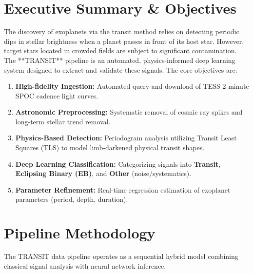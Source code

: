 \documentclass[11pt,a4paper]{article}
\begin{document}
\newpage
\clearpage

\section{Executive Summary \& Objectives}
The discovery of exoplanets via the transit method relies on detecting periodic dips in stellar brightness when a planet passes in front of its host star. However, target stars located in crowded fields are subject to significant contamination. The **TRANSIT** pipeline is an automated, physics-informed deep learning system designed to extract and validate these signals. The core objectives are:
\begin{enumerate}
    \item \textbf{High-fidelity Ingestion:} Automated query and download of TESS 2-minute SPOC cadence light curves.
    \item \textbf{Astronomic Preprocessing:} Systematic removal of cosmic ray spikes and long-term stellar trend removal.
    \item \textbf{Physics-Based Detection:} Periodogram analysis utilizing Transit Least Squares (TLS) to model limb-darkened physical transit shapes.
    \item \textbf{Deep Learning Classification:} Categorizing signals into \textbf{Transit}, \textbf{Eclipsing Binary (EB)}, and \textbf{Other} (noise/systematics).
    \item \textbf{Parameter Refinement:} Real-time regression estimation of exoplanet parameters (period, depth, duration).
\end{enumerate}

\section{Pipeline Methodology}
The TRANSIT data pipeline operates as a sequential hybrid model combining classical signal analysis with neural network inference.
\end{document}
